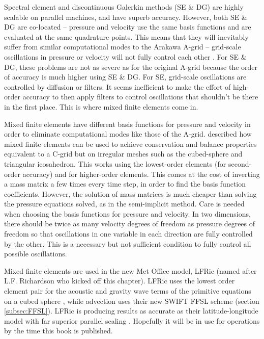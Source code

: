 Spectral element and discontinuous Galerkin methods (SE \& DG) are
highly scalable on parallel machines, and have superb accuracy. However,
both SE \& DG are co-located -- pressure and velocity use the same
basis functions and are evaluated at the same quadrature points. This
means that they will inevitably suffer from similar computational
modes to the Arakawa A-grid -- grid-scale oscillations in pressure
or velocity will not fully control each other \citep{MST12}. For
SE \& DG, these problems are not as severe as for the original A-grid
because the order of accuracy is much higher using SE \& DG. For SE,
grid-scale oscillations are controlled by diffusion or filters. It
seems inefficient to make the effort of high-order accuracy to then
apply filters to control oscillations that shouldn't be there in the
first place. This is where mixed finite elements come in.

Mixed finite elements have different basis functions for pressure
and velocity in order to eliminate computational modes like those
of the A-grid. \citet{CS12} described how mixed finite elements can
be used to achieve conservation and balance properties equivalent
to a C-grid but on irregular meshes such as the cubed-sphere and triangular
icosahedron. This works using the lowest-order elements (for second-order
accuracy) and for higher-order elements. This comes at the cost of
inverting a mass matrix a few times every time step, in order to find
the basis function coefficients. However, the solution of mass matrices
is much cheaper than solving the pressure equations solved, as in
the semi-implicit method. Care is needed when choosing the basis functions
for pressure and velocity. In two dimensions, there should be twice
as many velocity degrees of freedom as pressure degrees of freedom
so that oscillations in one variable in each direction are fully controlled
by the other. This is a necessary but not sufficient condition to
fully control all possible oscillations. 

Mixed finite elements are used in the new Met Office model, LFRic
(named after L.F. Richardson who kicked off this chapter). LFRic uses
the lowest order element pair for the acoustic and gravity wave terms
of the primitive equations on a cubed sphere \citep{AFH+19}, while
advection uses their new SWIFT FFSL scheme (section \ref{subsec:FFSL}).
LFRic is producing results as accurate as their latitude-longitude
model with far superior parallel scaling \citep{BBD+26}. Hopefully
it will be in use for operations by the time this book is published.

